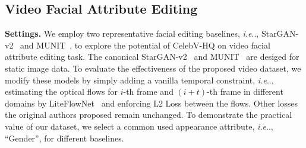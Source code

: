 \documentclass[runningheads]{llncs}
\makeatletter
\DeclareRobustCommand\onedot{\futurelet\@let@token\@onedot}
\def\@onedot{\ifx\@let@token.\else.\null\fi\xspace}
\def\ie{\emph{i.e}\onedot} \def\Ie{\emph{I.e}\onedot}
\makeatother
\begin{document}
\begin{table}[t]
\vspace{-2mm}
\caption{\textbf{Quantitative results of video facial attribute editing.} We evaluate two video facial editing baselines. The ``Video'' version achieves lower FVD scores and comparable FID performance than ``Original''. ``$\downarrow$'' means a lower value is better.}
\centering
{}
\label{tbl:i2i}
\vspace{-5mm}
\end{table}

\subsection{Video Facial Attribute Editing}
\noindent
\textbf{Settings.}
We employ two representative facial editing baselines, \ie, StarGAN-v2~\cite{starganv2} and MUNIT~\cite{munit}, to explore the potential of CelebV-HQ on video facial attribute editing task.
The canonical StarGAN-v2~\cite{starganv2} and MUNIT~\cite{munit} are desiged for static image data. To evaluate the effectiveness of the proposed video dataset, we modify these models by simply adding a vanilla temporal constraint, \ie, estimating the optical flows for $i$-th frame and $(i+t)$-th frame in different domains by LiteFlowNet~\cite{hui20liteflownet3} and enforcing L2 Loss between the flows. Other losses the original authors proposed remain unchanged.
To demonstrate the practical value of our dataset, we select a common used appearance attribute, \ie, ``Gender'', for different baselines. 
\end{document}
